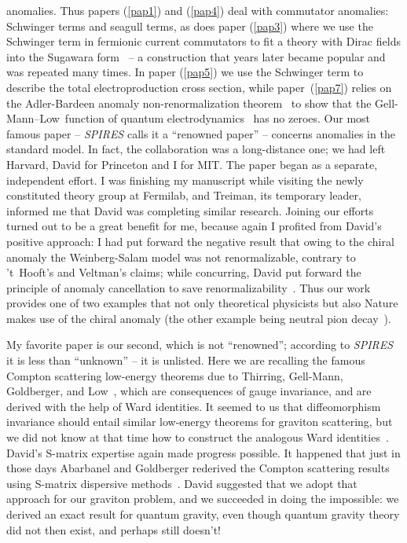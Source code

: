 \documentclass[a4paper,12pt,twoside]{article}
\newcommand{\refpap}[1]{(\ref{pap#1})}
\begin{document}
anomalies.  Thus papers \refpap1 and \refpap4 deal with commutator anomalies: 
Schwinger terms and seagull terms,  as does paper \refpap3 where we use the
Schwinger term in fermionic current commutators to fit a theory with Dirac fields into
the Sugawara form~\cite{ref1A} -- a construction that years later became popular and
was repeated many times. In paper
\refpap5 we use the Schwinger term to describe the total electroproduction cross
section, while paper~\refpap7 relies on the Adler-Bardeen anomaly
non-renormalization theorem~\cite{ref2A} to show that the Gell-Mann--Low~function
of quantum electrodynamics~\cite{ref3A} has no zeroes.  Our most famous paper --
{\sl\uppercase{Spires}} calls it a ``renowned paper'' --  concerns anomalies in the
standard model.  In fact, the collaboration was a long-distance one;  we had left
Harvard, David for Princeton and I for MIT.  The paper began as a separate,
independent effort.  I was finishing my manuscript while visiting the newly
constituted theory group at Fermilab, and Treiman, its temporary leader, informed
me that David was completing similar research.  Joining our efforts turned out to be a
great benefit for me, because  again I profited from David's positive approach:  I had
put forward the negative result that owing to the chiral anomaly the
Weinberg-Salam model was not renormalizable, contrary to 't~Hooft's and Veltman's
claims; while concurring, David put forward the principle of anomaly cancellation to
save renormalizability~\cite{ref4A}.  Thus our work provides one of two examples
that not only theoretical physicists  but also Nature makes use of the chiral anomaly
(the other example being neutral pion decay~\cite{ref5A}).

My favorite paper is our second, which is not ``renowned''; according to
{\sl\uppercase{Spires}} it is less than ``unknown'' -- it is unlisted. Here we are
recalling the famous Compton scattering low-energy theorems due to Thirring,
Gell-Mann, Goldberger, and Low~\cite{ref6A}, which are consequences of gauge
invariance, and are derived with the help of Ward identities. It seemed to us that
diffeomorphism invariance should entail similar low-energy theorems for graviton
scattering, but we did not know at that time how to construct the analogous Ward
identities~\cite{ref7A}.   David's S-matrix expertise again made progress possible.
It happened that just in those days Abarbanel and Goldberger rederived the
Compton scattering results using S-matrix dispersive methods~\cite{ref8A}. David
suggested that we adopt that approach for our graviton problem, and we succeeded
in doing the impossible: we derived an exact result for quantum gravity, even though
quantum gravity theory did not then exist, and perhaps still doesn't!
\end{document}
